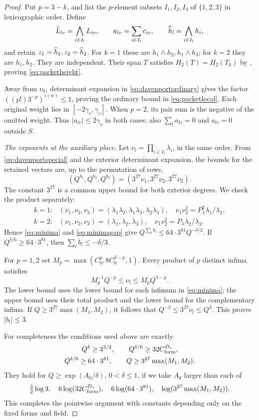 \documentclass[11pt]{article}
\numberwithin{equation}{section}
\theoremstyle{remark}\newtheorem{remark}[theorem]{Remark}
\begin{document}
\begin{proof}
Put $p=3-k$, and list the $p$-element subsets $I_1,I_2,I_3$ of
$\{1,2,3\}$ in lexicographic order. Define
\[
 \widehat L_{lv}=\bigwedge_{i\in I_l}L_{iv},\qquad
 a_{lv}=\sum_{i\in I_l}c_{iv},\qquad
 \widehat h_l=\bigwedge_{i\in I_l}h_i,
\]
and retain $z_1=\widehat h_1,z_2=\widehat h_2$. For $k=1$ these are
$h_1\wedge h_2,h_1\wedge h_3$; for $k=2$ they are $h_1,h_2$.
They are independent. Their span $T$ satisfies
$H_2(T)=H_2(T_k)$ by \cite[Lemma~6.1]{EF13}, proving
\eqref{eq:packetheight}.

Away from $v_0$, determinant expansion in
\eqref{eq:davenportordinary} gives the factor
$((p!)3^{-p})^{s(w)}\le1$, proving the ordinary bound in
\eqref{eq:packetlocal}. Each original weight lies in
$[-2\gamma_v,\gamma_v]$. When $p=2$, its pair sum is the negative
of the omitted weight. Thus $|a_{lv}|\le2\gamma_v$ in both cases;
also $\sum_la_{lv}=0$ and $a_{lv}=0$ outside $S$.

\emph{The exponents at the auxiliary place.}
Let $\nu_l=\prod_{i\in I_l}\lambda_i$, in the same order. From
\eqref{eq:davenportspecial} and the exterior determinant expansion,
the bounds for the retained vectors are, up to the permutation of rows,
\[
 (Q^{b_1},Q^{b_2},Q^{b_3})
 =(3^{27}\nu_1,3^{27}\nu_2,3^{27}\nu_2).
\]
The constant $3^{27}$ is a common upper bound for both exterior
degrees. We check the product separately:
\[
 \begin{array}{ll}
 k=1:&(\nu_1,\nu_2,\nu_3)
       =(\lambda_1\lambda_2,\lambda_1\lambda_3,\lambda_2\lambda_3),
       \quad\nu_1\nu_2^2=P_\lambda^2\lambda_1/\lambda_2,\\[2pt]
 k=2:&(\nu_1,\nu_2,\nu_3)=(\lambda_1,\lambda_2,\lambda_3),
       \quad\nu_1\nu_2^2=P_\lambda\lambda_2/\lambda_3.
 \end{array}
\]
Hence \eqref{eq:minima} and \eqref{eq:minimagap} give
$Q^{\sum_lb_l}\le64\cdot3^{81}Q^{-\delta/2}$.
If $Q^{\delta/6}\ge64\cdot3^{81}$, then $\sum_lb_l\le-\delta/3$.

For $p=1,2$ set $M_p=\max(C_0^p,8C_0^{3-p},1)$.
Every product of $p$ distinct infima satisfies
\[
 M_p^{-1}Q^{-p}\le\nu_l\le M_pQ^{3-p}.
\]
The lower bound uses the lower bound for each infimum in
\eqref{eq:minima}; the upper bound uses their total product and the
lower bound for the complementary infima. If
$Q\ge3^{27}\max(M_1,M_2)$, it follows that
$Q^{-3}\le3^{27}\nu_l\le Q^3$. This proves $|b_l|\le3$.

For completeness the conditions used above are exactly
\begin{equation}\label{eq:pointwisecutoffs}
 \begin{gathered}
 Q^\delta\ge3^{3/2},\qquad
 Q^{\delta/6}\ge32C_{\rm form}^{D_*},\\
 Q^{\delta/6}\ge64\cdot3^{81},\qquad
 Q\ge3^{27}\max(M_1,M_2).
 \end{gathered}
\end{equation}
They hold for $Q\ge\exp(A_0/\delta)$, $0<\delta\le1$, if we take
$A_0$ larger than each of
\[
 \tfrac32\log3,\quad6\log(32C_{\rm form}^{D_*}),\quad
 6\log(64\cdot3^{81}),\quad\log(3^{27}\max(M_1,M_2)).
\]
This completes the pointwise argument with constants depending only
on the fixed forms and field.
\end{proof}
\end{document}
